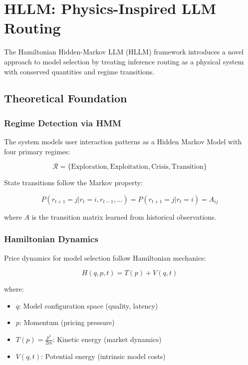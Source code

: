 \section{HLLM: Physics-Inspired LLM Routing}


The Hamiltonian Hidden-Markov LLM (HLLM) framework introduces a novel approach to model selection by treating inference routing as a physical system with conserved quantities and regime transitions.

\subsection{Theoretical Foundation}

\subsubsection{Regime Detection via HMM}

The system models user interaction patterns as a Hidden Markov Model with four primary regimes:

\begin{equation}
\mathcal{R} = \{\text{Exploration}, \text{Exploitation}, \text{Crisis}, \text{Transition}\}
\end{equation}

State transitions follow the Markov property:

\begin{equation}
P(r_{t+1} = j | r_t = i, r_{t-1}, \ldots) = P(r_{t+1} = j | r_t = i) = A_{ij}
\end{equation}

where $A$ is the transition matrix learned from historical observations.

\subsubsection{Hamiltonian Dynamics}

Price dynamics for model selection follow Hamiltonian mechanics:

\begin{equation}
H(q, p, t) = T(p) + V(q, t)
\end{equation}

where:
\begin{itemize}
\item $q$: Model configuration space (quality, latency)
\item $p$: Momentum (pricing pressure)
\item $T(p) = \frac{p^2}{2m}$: Kinetic energy (market dynamics)
\item $V(q,t)$: Potential energy (intrinsic model costs)
\end{itemize}

